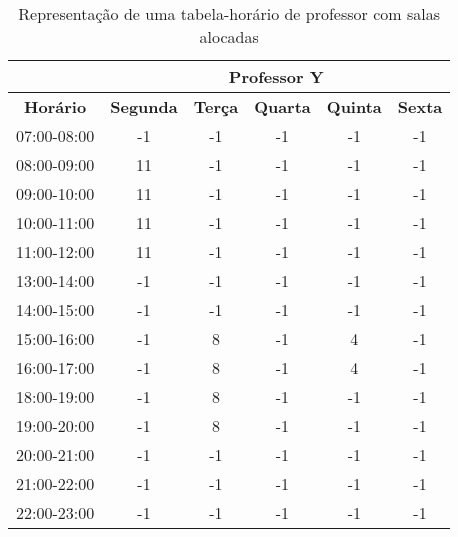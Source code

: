 \begin{table}[H]
\centering
\begin{tabular}{|c|c|c|c|c|c|}
\hline
\textbf{} & \multicolumn{5}{c|}{\textbf{Professor Y}} \\ \hline
\textbf{Horário} & \textbf{Segunda} & \textbf{Terça} & \textbf{Quarta} & \textbf{Quinta} & \textbf{Sexta} \\ \hline
07:00-08:00 & -1  & -1  & -1  & -1  & -1  \\ \hline
08:00-09:00 & \cellcolor[HTML]{C0C0C0}11  & -1  & -1  & -1  & -1  \\ \hline
09:00-10:00 & \cellcolor[HTML]{C0C0C0}11  & -1  & -1  & -1  & -1  \\ \hline
10:00-11:00 & \cellcolor[HTML]{C0C0C0}11  & -1  & -1  & -1  & -1  \\ \hline
11:00-12:00 & \cellcolor[HTML]{C0C0C0}11  & -1  & -1  & -1  & -1  \\ \hline
13:00-14:00 & -1  & -1  & -1  & -1  & -1  \\ \hline
14:00-15:00 & -1  & -1  & -1  & -1  & -1  \\ \hline
15:00-16:00 & -1  &  \cellcolor[HTML]{C0C0C0}8  & -1  &  \cellcolor[HTML]{C0C0C0}4  & -1  \\ \hline
16:00-17:00 & -1  &  \cellcolor[HTML]{C0C0C0}8  & -1  &  \cellcolor[HTML]{C0C0C0}4  & -1  \\ \hline
18:00-19:00 & -1  &  \cellcolor[HTML]{C0C0C0}8  & -1  & -1  & -1  \\ \hline
19:00-20:00 & -1  &  \cellcolor[HTML]{C0C0C0}8  & -1  & -1  & -1  \\ \hline
20:00-21:00 & -1  & -1  & -1  & -1  & -1  \\ \hline
21:00-22:00 & -1  & -1  & -1  & -1  & -1  \\ \hline
22:00-23:00 & -1  & -1  & -1  & -1  & -1  \\ \hline
\end{tabular}
\caption{Representação de uma tabela-horário de professor com salas alocadas}
\label{tbl_prof}
\end{table}


